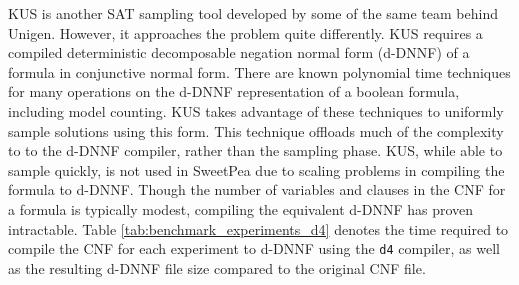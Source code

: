 KUS \cite{SGRM18} is another SAT sampling tool developed by some of the same team behind Unigen. However, it approaches the problem quite differently. KUS requires a compiled deterministic decomposable negation normal form (d-DNNF) of a formula in conjunctive normal form. There are known polynomial time techniques for many operations on the d-DNNF representation of a boolean formula, including model counting. KUS takes advantage of these techniques to uniformly sample solutions using this form. This technique offloads much of the complexity to to the d-DNNF compiler, rather than the sampling phase. KUS, while able to sample quickly, is not used in SweetPea due to scaling problems in compiling the formula to d-DNNF. Though the number of variables and clauses in the CNF for a formula is typically modest, compiling the equivalent d-DNNF has proven intractable. Table \ref{tab:benchmark_experiments_d4} denotes the time required to compile the CNF for each experiment to d-DNNF using the \texttt{d4} compiler, as well as the resulting d-DNNF file size compared to the original CNF file.





